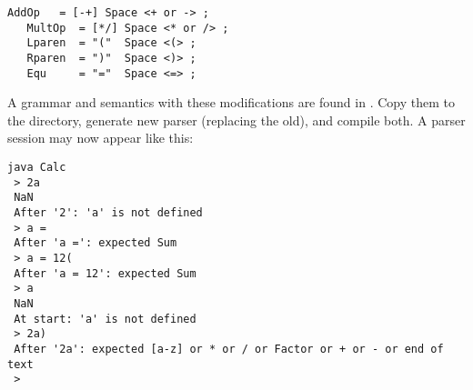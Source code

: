 \small
\begin{Verbatim}[frame=single,framesep=2mm,samepage=true,xleftmargin=15mm,xrightmargin=15mm,baselinestretch=0.8]
   AddOp   = [-+] Space <+ or -> ;
   MultOp  = [*/] Space <* or /> ;
   Lparen  = "("  Space <(> ;
   Rparen  = ")"  Space <)> ;
   Equ     = "="  Space <=> ;
\end{Verbatim}
\normalsize

A grammar and semantics with these modifications are found in .
Copy them to the  directory, generate new parser (replacing the old), and compile both.
A parser session may now appear like this:

\small
\begin{Verbatim}[samepage=true,xleftmargin=15mm,baselinestretch=0.8]
 java Calc
 > 2a
 NaN
 After '2': 'a' is not defined
 > a =
 After 'a =': expected Sum 
 > a = 12(
 After 'a = 12': expected Sum
 > a
 NaN
 At start: 'a' is not defined 
 > 2a)
 After '2a': expected [a-z] or * or / or Factor or + or - or end of text
 >
\end{Verbatim}
\normalsize


